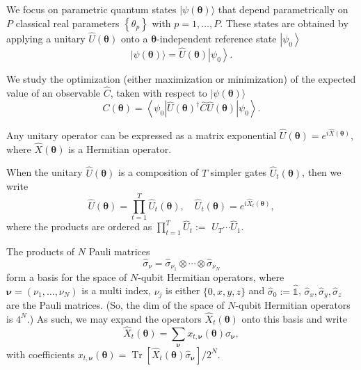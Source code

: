 
We focus on parametric quantum states $|\psi(\boldsymbol{\theta})\rangle$ that depend parametrically on $P$ classical real parameters $\left\{\theta_p\right\}$ with $p=1, \ldots, P$. These states are obtained by applying a unitary $\hat{U}(\boldsymbol{\theta})$ onto a $\boldsymbol{\theta}$-independent reference state $\left|\psi_0\right\rangle$
\begin{equation}
    |\psi(\boldsymbol{\theta})\rangle=\hat{U}(\boldsymbol{\theta})\left|\psi_0\right\rangle.
\end{equation}

We study the optimization (either maximization or minimization) of the expected value of an observable $\hat{C}$, taken with respect to $|\psi(\boldsymbol{\theta})\rangle$
\begin{equation}
    C(\boldsymbol{\theta})=\left\langle\psi_0\left|\hat{U}(\boldsymbol{\theta})^{\dagger} \hat{C} \hat{U}(\boldsymbol{\theta})\right| \psi_0\right\rangle.
\end{equation}

\begin{lemma}
    Any unitary operator can be expressed as a matrix exponential $\hat{U}(\boldsymbol{\theta})=e^{i \hat{X}(\boldsymbol{\theta})}$, where $\hat{X}(\boldsymbol{\theta})$ is a Hermitian operator. 
\end{lemma}

When the unitary $\hat{U}(\boldsymbol{\theta})$ is a composition of $T$ simpler gates $\hat{U}_t(\boldsymbol{\theta})$, then we write
\begin{equation}
    \hat{U}(\boldsymbol{\theta})=\prod_{t=1}^T \hat{U}_t(\boldsymbol{\theta}), \quad \hat{U}_t(\boldsymbol{\theta})=e^{i \hat{X}_t(\boldsymbol{\theta})},
\end{equation}
where the products are ordered as $\prod_{t=1}^T \hat{U}_t:=$ $\hat{U}_T \cdots \hat{U}_1$. 

The products of $N$ Pauli matrices 
$$
\hat{\sigma}_\nu= \hat{\sigma}_{\nu_1} \otimes \cdots \otimes \hat{\sigma}_{\nu_N}
$$
form a basis for the space of $N$-qubit Hermitian operators, where $\boldsymbol{\nu}=\left(\nu_1, \ldots, \nu_N\right)$ is a multi index, $\nu_j$ is either $\{0, x, y, z\}$ and $\hat{\sigma}_0:=\hat{\mathbb{1}}$, $\hat{\sigma}_x, \hat{\sigma}_y, \hat{\sigma}_z$ are the Pauli matrices. (So, the dim of the space of $N$-qubit Hermitian operators is $4^{N}.$) As such, we may expand the operators $\hat{X}_t(\boldsymbol{\theta})$ onto this basis and write
\begin{equation}\tag{5}
    \hat{X}_t(\boldsymbol{\theta})=\sum_{\boldsymbol{\nu}} x_{t, \boldsymbol{\nu}}(\boldsymbol{\theta}) \hat{\sigma}_{\boldsymbol{\nu}},
\end{equation}
with coefficients $x_{t, \boldsymbol{\nu}}(\boldsymbol{\theta})=\operatorname{Tr}\left[\hat{X}_t(\boldsymbol{\theta}) \hat{\sigma}_{\boldsymbol{\nu}}\right] / 2^N$. 

